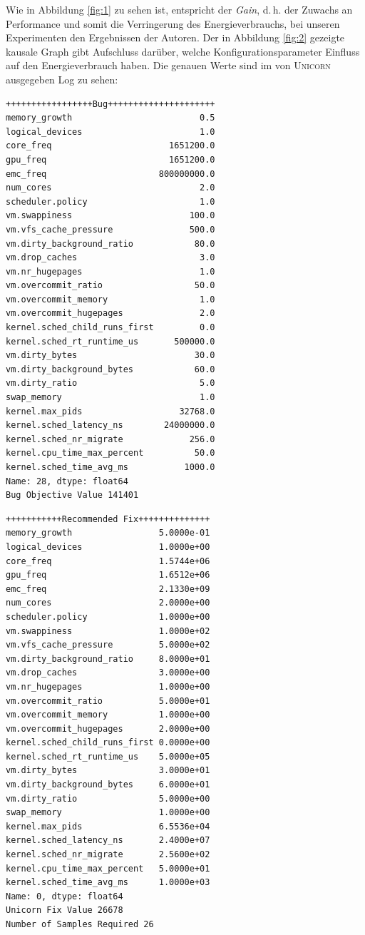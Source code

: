 \documentclass[11pt]{article}
\begin{document}
Wie in Abbildung \ref{fig:1} zu sehen ist, entspricht der \textit{Gain}, d.\,h. der Zuwachs an Performance und somit die Verringerung des Energieverbrauchs, bei unseren Experimenten den Ergebnissen der Autoren. Der in Abbildung \ref{fig:2} gezeigte kausale Graph gibt Aufschluss darüber, welche Konfigurationsparameter Einfluss auf den Energieverbrauch haben. Die genauen Werte sind im von \textsc{Unicorn} ausgegeben Log zu sehen:

\begin{Verbatim}[fontsize=\small,samepage=true]
+++++++++++++++++Bug+++++++++++++++++++++
memory_growth                         0.5
logical_devices                       1.0
core_freq                       1651200.0
gpu_freq                        1651200.0
emc_freq                      800000000.0
num_cores                             2.0
scheduler.policy                      1.0
vm.swappiness                       100.0
vm.vfs_cache_pressure               500.0
vm.dirty_background_ratio            80.0
vm.drop_caches                        3.0
vm.nr_hugepages                       1.0
vm.overcommit_ratio                  50.0
vm.overcommit_memory                  1.0
vm.overcommit_hugepages               2.0
kernel.sched_child_runs_first         0.0
kernel.sched_rt_runtime_us       500000.0
vm.dirty_bytes                       30.0
vm.dirty_background_bytes            60.0
vm.dirty_ratio                        5.0
swap_memory                           1.0
kernel.max_pids                   32768.0
kernel.sched_latency_ns        24000000.0
kernel.sched_nr_migrate             256.0
kernel.cpu_time_max_percent          50.0
kernel.sched_time_avg_ms           1000.0
Name: 28, dtype: float64
Bug Objective Value 141401
\end{Verbatim}

\begin{Verbatim}[fontsize=\small,samepage=true]
+++++++++++Recommended Fix++++++++++++++
memory_growth                 5.0000e-01
logical_devices               1.0000e+00
core_freq                     1.5744e+06
gpu_freq                      1.6512e+06
emc_freq                      2.1330e+09
num_cores                     2.0000e+00
scheduler.policy              1.0000e+00
vm.swappiness                 1.0000e+02
vm.vfs_cache_pressure         5.0000e+02
vm.dirty_background_ratio     8.0000e+01
vm.drop_caches                3.0000e+00
vm.nr_hugepages               1.0000e+00
vm.overcommit_ratio           5.0000e+01
vm.overcommit_memory          1.0000e+00
vm.overcommit_hugepages       2.0000e+00
kernel.sched_child_runs_first 0.0000e+00
kernel.sched_rt_runtime_us    5.0000e+05
vm.dirty_bytes                3.0000e+01
vm.dirty_background_bytes     6.0000e+01
vm.dirty_ratio                5.0000e+00
swap_memory                   1.0000e+00
kernel.max_pids               6.5536e+04
kernel.sched_latency_ns       2.4000e+07
kernel.sched_nr_migrate       2.5600e+02
kernel.cpu_time_max_percent   5.0000e+01
kernel.sched_time_avg_ms      1.0000e+03
Name: 0, dtype: float64
Unicorn Fix Value 26678
Number of Samples Required 26
\end{Verbatim}
\end{document}
